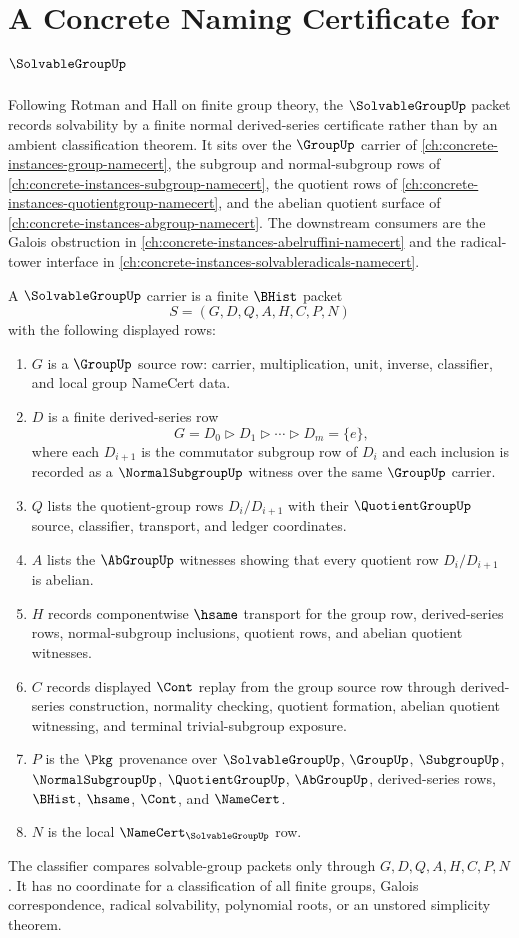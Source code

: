 \chapter{A Concrete Naming Certificate for $\SolvableGroupUp$}
\label{ch:concrete-instances-solvable-group-namecert}

Following Rotman and Hall on finite group theory, the $\SolvableGroupUp$ packet records solvability by a finite normal derived-series certificate rather than by an ambient classification theorem. It sits over the $\GroupUp$ carrier of \autoref{ch:concrete-instances-group-namecert}, the subgroup and normal-subgroup rows of \autoref{ch:concrete-instances-subgroup-namecert}, the quotient rows of \autoref{ch:concrete-instances-quotientgroup-namecert}, and the abelian quotient surface of \autoref{ch:concrete-instances-abgroup-namecert}. The downstream consumers are the Galois obstruction in \autoref{ch:concrete-instances-abelruffini-namecert} and the radical-tower interface in \autoref{ch:concrete-instances-solvableradicals-namecert}.

\begin{definition}
\label{def:solvable-group-carrier}
A $\SolvableGroupUp$ carrier is a finite $\BHist$ packet
$$
S=(G,D,Q,A,H,C,P,N)
$$
with the following displayed rows:
\begin{enumerate}
\item $G$ is a $\GroupUp$ source row: carrier, multiplication, unit, inverse, classifier, and local group NameCert data.
\item $D$ is a finite derived-series row
$$
G=D_0 \rhd D_1 \rhd \cdots \rhd D_m=\{e\},
$$
where each $D_{i+1}$ is the commutator subgroup row of $D_i$ and each inclusion is recorded as a $\NormalSubgroupUp$ witness over the same $\GroupUp$ carrier.
\item $Q$ lists the quotient-group rows $D_i/D_{i+1}$ with their $\QuotientGroupUp$ source, classifier, transport, and ledger coordinates.
\item $A$ lists the $\AbGroupUp$ witnesses showing that every quotient row $D_i/D_{i+1}$ is abelian.
\item $H$ records componentwise $\hsame$ transport for the group row, derived-series rows, normal-subgroup inclusions, quotient rows, and abelian quotient witnesses.
\item $C$ records displayed $\Cont$ replay from the group source row through derived-series construction, normality checking, quotient formation, abelian quotient witnessing, and terminal trivial-subgroup exposure.
\item $P$ is the $\Pkg$ provenance over $\SolvableGroupUp$, $\GroupUp$, $\SubgroupUp$, $\NormalSubgroupUp$, $\QuotientGroupUp$, $\AbGroupUp$, derived-series rows, $\BHist$, $\hsame$, $\Cont$, and $\NameCert$.
\item $N$ is the local $\NameCert_{\SolvableGroupUp}$ row.
\end{enumerate}
The classifier compares solvable-group packets only through $G,D,Q,A,H,C,P,N$. It has no coordinate for a classification of all finite groups, Galois correspondence, radical solvability, polynomial roots, or an unstored simplicity theorem.
\end{definition}

